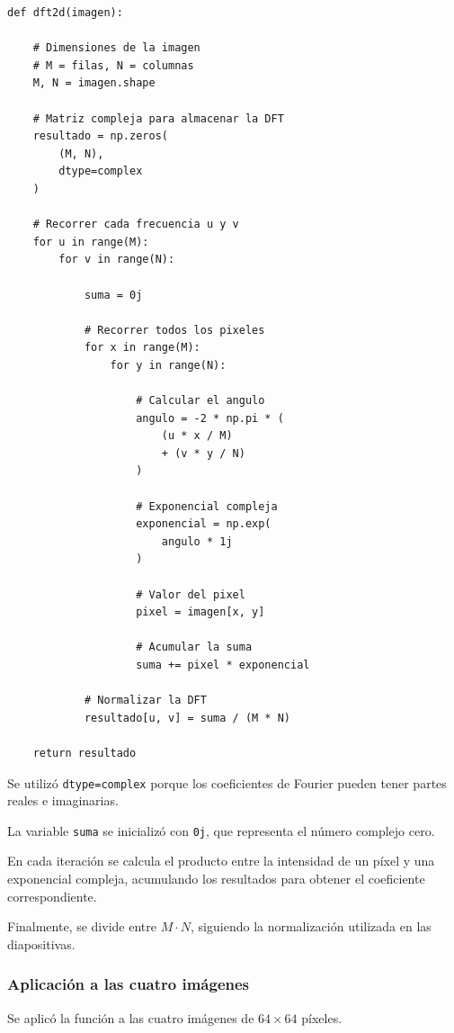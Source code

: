 \documentclass[11pt,letterpaper]{article}
\begin{document}
\begin{lstlisting}
def dft2d(imagen):

    # Dimensiones de la imagen
    # M = filas, N = columnas
    M, N = imagen.shape

    # Matriz compleja para almacenar la DFT
    resultado = np.zeros(
        (M, N),
        dtype=complex
    )

    # Recorrer cada frecuencia u y v
    for u in range(M):
        for v in range(N):

            suma = 0j

            # Recorrer todos los pixeles
            for x in range(M):
                for y in range(N):

                    # Calcular el angulo
                    angulo = -2 * np.pi * (
                        (u * x / M)
                        + (v * y / N)
                    )

                    # Exponencial compleja
                    exponencial = np.exp(
                        angulo * 1j
                    )

                    # Valor del pixel
                    pixel = imagen[x, y]

                    # Acumular la suma
                    suma += pixel * exponencial

            # Normalizar la DFT
            resultado[u, v] = suma / (M * N)

    return resultado
\end{lstlisting}

Se utilizó \texttt{dtype=complex} porque
los coeficientes de Fourier pueden tener
partes reales e imaginarias.

La variable \texttt{suma} se inicializó con
\texttt{0j}, que representa el número complejo cero.

En cada iteración se calcula el producto entre
la intensidad de un píxel y una exponencial compleja,
acumulando los resultados para obtener
el coeficiente correspondiente.

Finalmente, se divide entre $M\cdot N$,
siguiendo la normalización utilizada
en las diapositivas.

\subsubsection*{Aplicación a las cuatro imágenes}

Se aplicó la función a las cuatro imágenes
de $64\times64$ píxeles.
\end{document}
